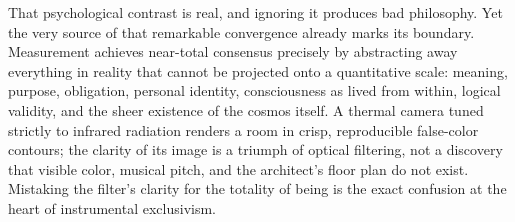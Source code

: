 That psychological contrast is real, and ignoring it produces bad philosophy. Yet the very source of that remarkable convergence already marks its boundary. Measurement achieves near-total consensus precisely by abstracting away everything in reality that cannot be projected onto a quantitative scale: meaning, purpose, obligation, personal identity, consciousness as lived from within, logical validity, and the sheer existence of the cosmos itself. A thermal camera tuned strictly to infrared radiation renders a room in crisp, reproducible false-color contours; the clarity of its image is a triumph of optical filtering, not a discovery that visible color, musical pitch, and the architect's floor plan do not exist. Mistaking the filter's clarity for the totality of being is the exact confusion at the heart of instrumental exclusivism.
